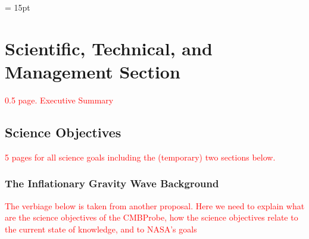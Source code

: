 \documentclass[12pt]{article}
\newcommand{\comred}[1]{\textcolor{red}{#1}}
\begin{document}


\setlength{\baselineskip}{0.96\baselineskip}
\setlength{\parskip}{1.\parskip}

\parindent = 15pt
\tableofcontents


\setcounter{figure}{0}

\newpage

\section{Scientific, Technical, and Management Section}

\vspace{-0.13in}

\comred{0.5 page. Executive Summary} 

\vspace{-0.22in}

\subsection{Science Objectives}
\label{sec:science}

\vspace{-0.05in}

\comred{5 pages for all science goals including the (temporary) two sections below.}

\subsubsection{The Inflationary Gravity Wave Background}

\vspace{-0.05in}

\comred{The verbiage below is taken from another proposal. Here we need to explain what are the science objectives 
of the CMBProbe, how the science objectives relate to the current state of knowledge, and to NASA's goals}
\end{document}
